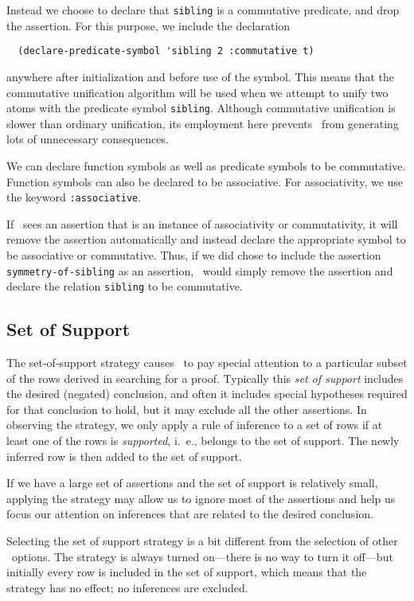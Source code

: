 Instead we choose to declare that {\tt sibling} is a
commutative predicate, and drop the assertion.  For this purpose, we
include the declaration
\begin{verbatim}
  (declare-predicate-symbol 'sibling 2 :commutative t)
\end{verbatim}
anywhere after initialization and before use of the symbol.  This means that
the commutative unification algorithm will be used when we attempt to unify
two atoms with the predicate symbol {\tt sibling}.  Although commutative
unification is slower than ordinary unification, its employment here prevents
\snark\  from generating lots of unnecessary consequences.

We can declare function symbols as well as predicate symbols to be
commutative.  Function symbols can also be declared to be associative.
For associativity, we use the keyword {\tt :associative}.

If \snark\  sees an assertion that is an instance of associativity or
commutativity, it will remove the assertion automatically and instead
declare the appropriate symbol to be associative or commutative.
Thus, if we did chose to include the assertion {\tt symmetry-of-sibling}
as an assertion, \snark\  would simply remove the assertion and declare
the relation {\tt sibling} to be commutative.

\subsection{Set of Support}
\label{subsec-set-of-support}
The set-of-support strategy causes \snark\  to pay special attention to a
particular subset of the rows derived in searching for a proof.  Typically
this {\em set of support} includes the desired (negated) conclusion, and often
it includes special hypotheses required for that conclusion to hold, but it
may exclude all the other assertions.  In observing the strategy, we only
apply a rule of inference to a set of rows if at least one of the rows is
{\em supported}, i.\  e.,
belongs to the set of support.  The newly inferred row is then added to the
set of support.

If we have a large set of assertions and the set of support is
relatively small, applying the strategy may allow us to ignore most of
the assertions and help us focus our attention on inferences that are
related to the desired conclusion.

Selecting the set of support strategy is a bit different from the
selection of other \snark\  options.  The strategy is always turned
on---there is no way to turn it off---but initially every row is
included in the set of support, which means that the strategy has no
effect; no inferences are excluded.

